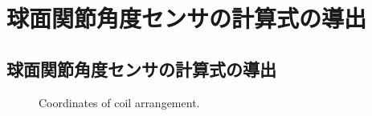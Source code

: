 \chapter{球面関節角度センサの計算式の導出}

\pagestyle{myheadings}

\section*{球面関節角度センサの計算式の導出}

\begin{figure}
 \begin{center}
  \caption{Coordinates of coil arrangement.}
  \label{fig:coordinates}
 \end{center}
\end{figure}





